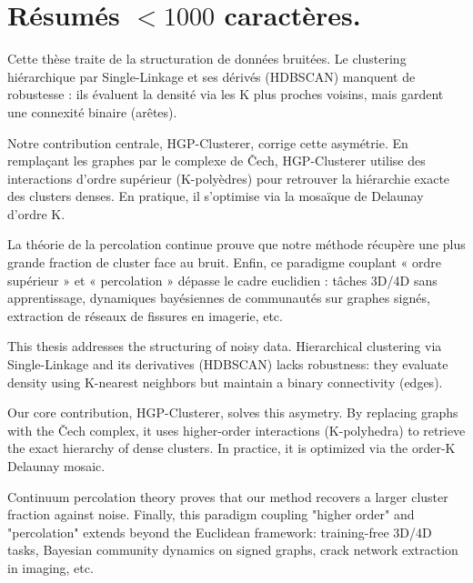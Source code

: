 \begin{AbstractPage}

\end{AbstractPage}


\section*{Résumés $<1000$ caractères.}

Cette thèse traite de la structuration de données bruitées. Le clustering hiérarchique par Single-Linkage et ses dérivés (HDBSCAN) manquent de robustesse : ils évaluent la densité via les K plus proches voisins, mais gardent une connexité binaire (arêtes).

Notre contribution centrale, HGP-Clusterer, corrige cette asymétrie. En remplaçant les graphes par le complexe de Čech, HGP-Clusterer utilise des interactions d'ordre supérieur (K-polyèdres) pour retrouver la hiérarchie exacte des clusters denses. En pratique, il s'optimise via la mosaïque de Delaunay d'ordre K.

La théorie de la percolation continue prouve que notre méthode récupère une plus grande fraction de cluster face au bruit. Enfin, ce paradigme couplant « ordre supérieur » et « percolation » dépasse le cadre euclidien : tâches 3D/4D sans apprentissage, dynamiques bayésiennes de communautés sur graphes signés, extraction de réseaux de fissures en imagerie, etc.

This thesis addresses the structuring of noisy data. Hierarchical clustering via Single-Linkage and its derivatives (HDBSCAN) lacks robustness: they evaluate density using K-nearest neighbors but maintain a binary connectivity (edges).

Our core contribution, HGP-Clusterer, solves this asymetry. By replacing graphs with the Čech complex, it uses higher-order interactions (K-polyhedra) to retrieve the exact hierarchy of dense clusters. In practice, it is optimized via the order-K Delaunay mosaic.

Continuum percolation theory proves that our method recovers a larger cluster fraction against noise. Finally, this paradigm coupling "higher order" and "percolation" extends beyond the Euclidean framework: training-free 3D/4D tasks, Bayesian community dynamics on signed graphs, crack network extraction in imaging, etc.